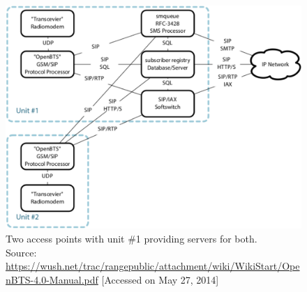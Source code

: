 \begin{figure}
  \centering
    \includegraphics[width=\textwidth]{btsLarge}
  \caption[OpenBTS network with two access points]{Two access points with unit 
  \#1 providing servers for both. \\
  \footnotesize{Source: \url{https://wush.net/trac/rangepublic/attachment/wiki/WikiStart/OpenBTS-4.0-Manual.pdf} [Accessed on May 27, 2014]}}
  \label{fig:btsLarge}
\end{figure}
